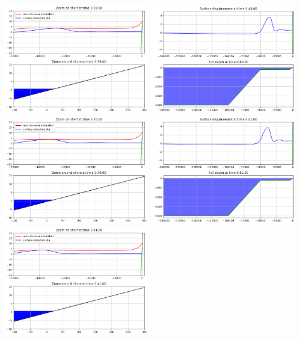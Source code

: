 \documentclass[11pt]{article}
\begin{document}
\includegraphics[width=0.475\textwidth]{frame0039fig1.png}
\vskip 10pt 
\includegraphics[width=0.475\textwidth]{frame0040fig0.png}
\includegraphics[width=0.475\textwidth]{frame0040fig1.png}
\vskip 10pt 
\includegraphics[width=0.475\textwidth]{frame0041fig0.png}
\includegraphics[width=0.475\textwidth]{frame0041fig1.png}
\end{document}
